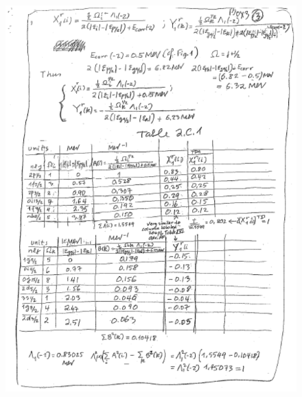 \documentclass[a4paper,11pt]{book}
\numberwithin{equation}{section}
\numberwithin{figure}{section}
\numberwithin{table}{section}
\begin{document}
\begin{figure}
\centerline{\includegraphics*[width=\textwidth,angle=0]{figs/box3_3.pdf}}
\end{figure}
\end{document}
